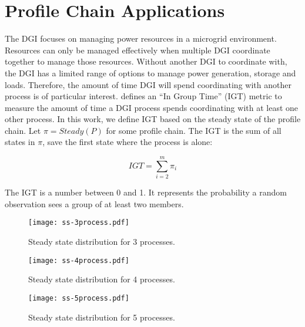 
\section{Profile Chain Applications}


The DGI focuses on managing power resources in a microgrid environment.
Resources can only be managed effectively when multiple DGI coordinate together to manage those resources.
Without another DGI to coordinate with, the DGI has a limited range of options to manage power generation, storage and loads.
Therefore, the amount of time DGI will spend coordinating with another process is of particular interest.
\cite{CRITIS2012} defines an ``In Group Time'' (IGT) metric to measure the amount of time a DGI process spends coordinating with at least one other process.
In this work, we define IGT based on the steady state of the profile chain.
Let $\pi=Steady(P)$ for some profile chain.
The IGT is the sum of all states in $\pi$, save the first state where the process is alone:

\[ IGT = \sum_{i=2}^{m} \pi_i \]

The IGT is a number between 0 and 1.
It represents the probability a random observation sees a group of at least two members.


\begin{figure}
    \centering
    \texttt{[image: ss-3process.pdf]}
    \caption{Steady state distribution for 3 processes.}
    \label{fig:ss-3process}
\end{figure}

\begin{figure}
    \centering
    \texttt{[image: ss-4process.pdf]}
    \caption{Steady state distribution for 4 processes.}
    \label{fig:ss-4process}
\end{figure}

\begin{figure}
    \centering
    \texttt{[image: ss-5process.pdf]}
    \caption{Steady state distribution for 5 processes.}
    \label{fig:ss-5process}
\end{figure}

